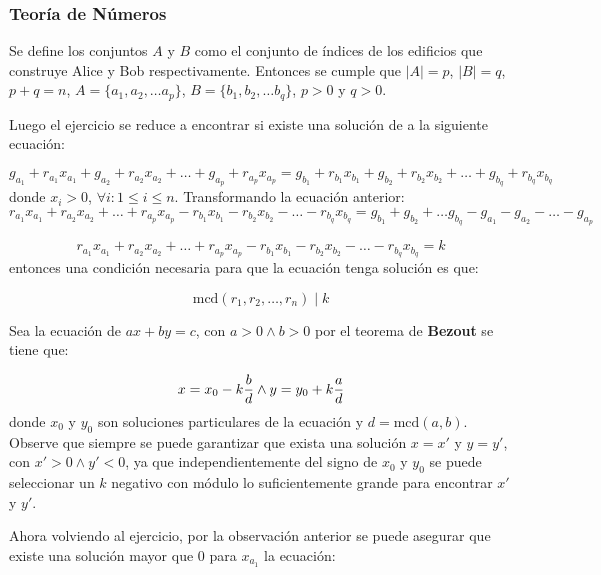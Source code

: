 \documentclass{article}
\begin{document}
\subsubsection{Teoría de Números}

Se define los conjuntos $A$ y $B$ como el conjunto de índices de los edificios que construye Alice y Bob respectivamente. Entonces
se cumple que $|A|=p$, $|B|=q$, $p+q=n$, $A=\{ a_1, a_2, \ldots a_p\}$, $B=\{ b_1, b_2, \ldots b_q\}$, $p>0$ y $q>0$.

Luego el ejercicio se reduce a encontrar si existe una solución de a la siguiente ecuación:

\begin{equation}
    g_{a_1}+r_{a_1}x_{a_1}+g_{a_2}+r_{a_2}x_{a_2}+\ldots +g_{a_p}+r_{a_p}x_{a_p}=g_{b_1}+r_{b_1}x_{b_1}+g_{b_2}+r_{b_2}x_{b_2}+\ldots +g_{b_q}+r_{b_q}x_{b_q}
\end{equation}
donde  $x_i > 0$, $\forall i : 1\leq i\leq n$. Transformando la ecuación anterior:
\begin{equation}
    r_{a_1}x_{a_1}+r_{a_2}x_{a_2}+\ldots +r_{a_p}x_{a_p}-r_{b_1}x_{b_1}-r_{b_2}x_{b_2}-\ldots -r_{b_q}x_{b_q}=g_{b_1}+g_{b_2}+\ldots g_{b_q}-g_{a_1}-g_{a_2}-\ldots -g_{a_p}
\end{equation}

\begin{equation}
    r_{a_1}x_{a_1}+r_{a_2}x_{a_2}+\ldots +r_{a_p}x_{a_p}-r_{b_1}x_{b_1}-r_{b_2}x_{b_2}-\ldots -r_{b_q}x_{b_q}=k
\end{equation}
entonces una condición necesaria para que la ecuación tenga solución es que:

\begin{equation}
    \text{mcd}(r_1, r_2, \ldots, r_n) \mid k
\end{equation}

Sea la ecuación de $ax+by=c$, con $a>0 \wedge b>0$ por el teorema de \textbf{Bezout} se tiene que:

\begin{equation}
    x=x_0-k{b\over d} \wedge y=y_0+k{a\over d}
\end{equation}
donde $x_0$ y $y_0$ son soluciones particulares de la ecuación y $d=\text{mcd}(a,b)$. Observe que siempre se puede garantizar
que exista una solución $x=x'$ y $y=y'$, con $x'>0 \wedge y'<0$, ya que independientemente del signo de $x_0$ y $y_0$ se puede
seleccionar un $k$ negativo con módulo lo suficientemente grande para encontrar $x'$ y $y'$.

Ahora volviendo al ejercicio, por la observación anterior se puede asegurar que existe una solución mayor que 0 para $x_{a_1}$ la ecuación:
\end{document}
